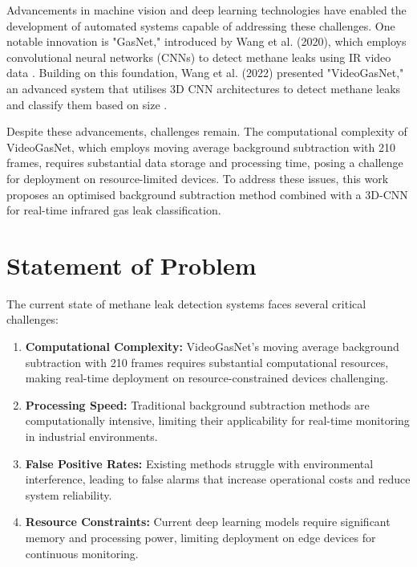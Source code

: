 Advancements in machine vision and deep learning technologies have enabled the development of automated systems capable of addressing these challenges. One notable innovation is "GasNet," introduced by Wang et al. (2020), which employs convolutional neural networks (CNNs) to detect methane leaks using IR video data \cite{wang2020machine}. Building on this foundation, Wang et al. (2022) presented "VideoGasNet," an advanced system that utilises 3D CNN architectures to detect methane leaks and classify them based on size \cite{wang2022videogasnet}.

Despite these advancements, challenges remain. The computational complexity of VideoGasNet, which employs moving average background subtraction with 210 frames, requires substantial data storage and processing time, posing a challenge for deployment on resource-limited devices. To address these issues, this work proposes an optimised background subtraction method combined with a 3D-CNN for real-time infrared gas leak classification.

\section{Statement of Problem}

The current state of methane leak detection systems faces several critical challenges:

\begin{enumerate}
\item \textbf{Computational Complexity:} VideoGasNet's moving average background subtraction with 210 frames requires substantial computational resources, making real-time deployment on resource-constrained devices challenging.

\item \textbf{Processing Speed:} Traditional background subtraction methods are computationally intensive, limiting their applicability for real-time monitoring in industrial environments.

\item \textbf{False Positive Rates:} Existing methods struggle with environmental interference, leading to false alarms that increase operational costs and reduce system reliability.

\item \textbf{Resource Constraints:} Current deep learning models require significant memory and processing power, limiting deployment on edge devices for continuous monitoring.
\end{enumerate}

